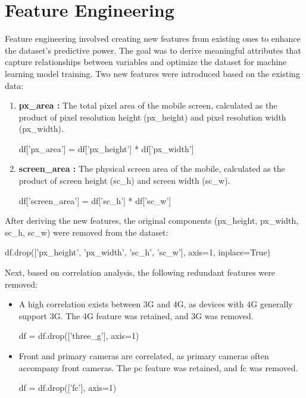 \documentclass[12pt]{report}
\begin{document}
\section{Feature Engineering}
Feature engineering involved creating new features from existing ones to enhance the dataset's predictive power. The goal was to derive meaningful attributes that capture relationships between variables and optimize the dataset for machine learning model training. Two new features were introduced based on the existing data:
\vspace{-1.25em}
\begin{enumerate}
	\setlength\itemsep{-1.05em}
	\item{\textbf{px\_area :}} The total pixel area of the mobile screen, calculated as the product of pixel resolution height (px\_height) and pixel resolution width (px\_width).
	\begin{python}
	df['px_area'] = df['px_height'] * df['px_width']
	\end{python}
	\item{\textbf{screen\_area :}} The physical screen area of the mobile, calculated as the product of screen height (sc\_h) and screen width (sc\_w).
	\begin{python}
	df['screen_area'] = df['sc_h'] * df['sc_w']
	\end{python}
\end{enumerate}
After deriving the new features, the original components (px\_height, px\_width, sc\_h, sc\_w) were removed from the dataset:
\begin{python}
df.drop(['px_height', 'px_width', 'sc_h', 'sc_w'], axis=1, inplace=True)
\end{python}
Next, based on correlation analysis, the following redundant features were removed:
\vspace{-1.25em}
\begin{itemize}
	\setlength\itemsep{-1.05em}
	\item A high correlation exists between 3G and 4G, as devices with 4G generally support 3G. The 4G feature was retained, and 3G was removed.
	\begin{python}
	df = df.drop(['three_g'], axis=1)
	\end{python}
	\item Front and primary cameras are correlated, as primary cameras often accompany front cameras. The pc feature was retained, and fc was removed.	
	\begin{python}
	df = df.drop(['fc'], axis=1)
	\end{python}
\end{itemize}
\end{document}
